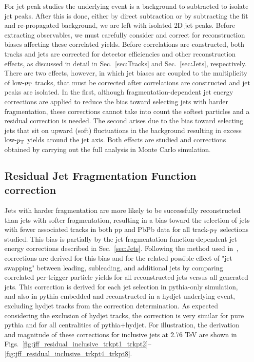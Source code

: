 For jet peak studies the underlying event is a background to subtracted to isolate jet peaks.  After this is done, either by direct subtraction or by subtracting the fit and re-propagated background, we are left with isolated 2D jet peaks.  Before extracting observables, we must carefully consider and correct for reconstruction biases affecting these correlated yields.  Before correlations are constructed, both tracks and jets are corrected for detector efficiencies and other reconstruction effects, as discussed in detail in Sec.~\ref{sec:Tracks} and Sec.~\ref{sec:Jets}, respectively.  There are two effects, however, in which jet biases are coupled to the multiplicity of low-$p_{\rm T}$ tracks, that must be corrected after correlations are constructed and jet peaks are isolated.  In the first, although fragmentation-dependent jet energy corrections are applied to reduce the bias toward selecting jets with harder fragmentation, these corrections cannot take into count the softest particles and a residual correction is needed.  The second arises due to the bias toward selecting jets that sit on upward (soft) fluctuations in the background resulting in excess low-$p_{\rm T}$ yields around the jet axis.  Both effects are studied and corrections obtained by carrying out the full analysis in Monte Carlo simulation.  

\subsection{Residual Jet Fragmentation Function correction}
	
	
Jets with harder fragmentation are more likely to be successfully reconstructed than jets with softer fragmentation, resulting in a bias toward the selection of jets with fewer associated tracks in both pp and PbPb data for all track-$p_{\rm T}$ selections studied.  This bias is partially by the jet fragmentation function-dependent jet energy corrections described in Sec.~\ref{sec:Jets}.  Following the method used in~\cite{HIN_2014_010}, corrections are derived for this bias and for the related possible effect of "jet swapping" between leading, subleading, and additional jets by comparing correlated per-trigger particle yields for all reconstructed jets versus all generated jets.  This correction is derived for each jet selection in {\sc pythia}-only simulation, and also in {\sc pythia} embedded and reconstructed in a {\sc hydjet} underlying event, excluding {\sc hydjet} tracks from the correction determination.  As expected considering the exclusion of {\sc hydjet} tracks, the correction is very similar for pure {\sc pythia} and for all centralities of {\sc pythia+hydjet}.  For illustration, the derivation and magnitude of these corrections for inclusive jets at 2.76 TeV are shown in Figs.~\ref{fig:jff_residual_inclusive_trkpt1_trkpt2}--\ref{fig:jff_residual_inclusive_trkpt4_trkpt8}.

